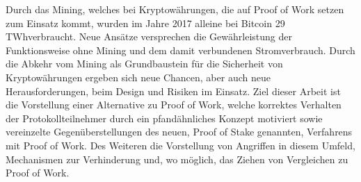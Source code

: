 Durch das Mining, welches bei Kryptow\"ahrungen, die auf Proof of Work setzen zum Einsatz kommt, wurden im Jahre 2017 alleine bei Bitcoin 29 TWh\footnotemark[1] verbraucht.
Neue Ans\"atze versprechen die Gew\"ahrleistung der Funktionsweise ohne Mining und dem damit verbundenen Stromverbrauch.
Durch die Abkehr vom Mining als Grundbaustein f\"ur die Sicherheit von Kryptow\"ahrungen ergeben sich neue Chancen, aber auch neue Herausforderungen, beim Design und Risiken im Einsatz.
Ziel dieser Arbeit ist die Vorstellung einer Alternative zu Proof of Work, welche korrektes Verhalten der Protokollteilnehmer durch ein pfand\"ahnliches Konzept motiviert sowie vereinzelte Gegen\"uberstellungen des neuen, Proof of Stake genannten, Verfahrens mit Proof of Work.
Des Weiteren die Vorstellung von Angriffen in diesem Umfeld, Mechanismen zur Verhinderung und, wo möglich, das Ziehen von Vergleichen zu Proof of Work.
